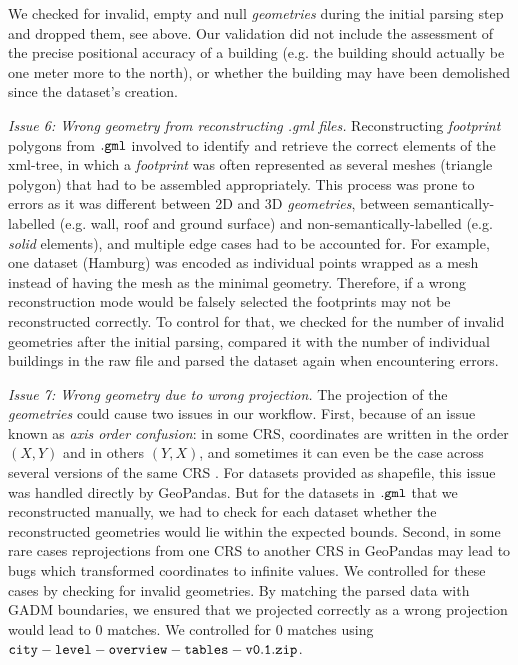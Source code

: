 \documentclass[fleqn,10pt]{wlscirep}
\begin{document}
We checked for invalid, empty and null \textit{geometries} during the initial parsing step and dropped them, see above. Our validation did not include the assessment of the precise positional accuracy of a building (e.g. the building should actually be one meter more to the north), or whether the building may have been demolished since the dataset's creation.

\medskip \noindent \textit{Issue 6: Wrong geometry from reconstructing .gml files.} \hspace{0.1cm} Reconstructing \textit{footprint} polygons from $\tt{.gml}$ involved to identify and retrieve the correct elements of the xml-tree, in which a \textit{footprint} was often represented as several meshes (triangle polygon) that had to be assembled appropriately. This process was prone to errors as it was different between 2D and 3D \textit{geometries}, between semantically-labelled (e.g. wall, roof and ground surface) and non-semantically-labelled (e.g. \textit{solid} elements), and multiple edge cases had to be accounted for. For example, one dataset (Hamburg) was encoded as individual points wrapped as a mesh instead of having the mesh as the minimal geometry. Therefore, if a wrong reconstruction mode would be falsely selected the footprints may not be reconstructed correctly. To control for that, we checked for the number of invalid geometries after the initial parsing, compared it with the number of individual buildings in the raw file and parsed the dataset again when encountering errors.       

\medskip \noindent \textit{Issue 7: Wrong geometry due to wrong projection.} \hspace{0.1cm} The projection of the \textit{geometries} could cause two issues in our workflow. First, because of an issue known as \textit{axis order confusion}: in some CRS, coordinates are written in the order $(X,Y)$ and in others $(Y,X)$, and sometimes it can even be the case across several versions of the same CRS \cite{reed2017}. For datasets provided as shapefile, this issue was handled directly by GeoPandas. But for the datasets in $\tt{.gml}$ that we reconstructed manually, we had to check for each dataset whether the reconstructed geometries would lie within the expected bounds. Second, in some rare cases reprojections from one CRS to another CRS in GeoPandas may lead to bugs which transformed coordinates to infinite values. We controlled for these cases by checking for invalid geometries. By matching the parsed data with GADM boundaries, we ensured that we projected correctly as a wrong projection would lead to 0 matches. We controlled for 0 matches using ${\tt city-level-overview-tables-v0.1.zip}$. 
\end{document}
